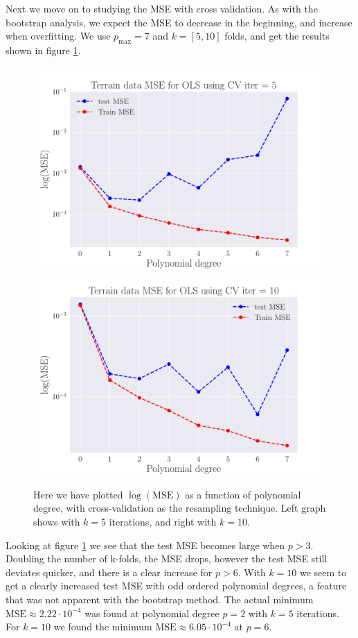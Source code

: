 \documentclass[reprint,english,notitlepage,aps,nobalancelastpage,nofootinbib]{revtex4-1}  %
\begin{document}
Next we move on to studying the MSE with cross validation. As with the bootstrap analysis, we expect the MSE to decrease in the beginning, and increase when overfitting. We use $p_\text{max} = 7$ and $k=[5,10]$ folds, and get the results shown in figure \ref{fig:terrain_OLS_MSE_CV}.

\begin{figure}[h]
	\includegraphics[width=\linewidth]{SRTM_MSE_OLS_n50_pol7_CV_re5_log.pdf}
	\endminipage\hfill
	\includegraphics[width=\linewidth]{SRTM_MSE_OLS_n50_pol7_CV_re10_log.pdf}
	\endminipage
	\caption{Here we have plotted $\log(\text{MSE})$ as a function of polynomial degree, with cross-validation as the resampling technique. Left graph shows with $k=5$ iterations, and right with $k=10$.}
  \label{fig:terrain_OLS_MSE_CV}
\end{figure}
Looking at figure \ref{fig:terrain_OLS_MSE_CV} we see that the test MSE becomes large when $p>3$. Doubling the number of k-folds, the MSE drops, however the test MSE still deviates quicker, and there is a clear increase for $p>6$. With $k=10$ we seem to get a clearly increased test MSE with odd ordered polynomial degrees, a feature that was not apparent with the bootstrap method. The actual minimum $\text{MSE} \approx 2.22\cdot10^{-4}$ was found at polynomial degree $p=2$ with $k=5$ iterations. For $k=10$ we found the minimum $\text{MSE} \approx 6.05\cdot10^{-4}$ at $p=6$.
\end{document}
